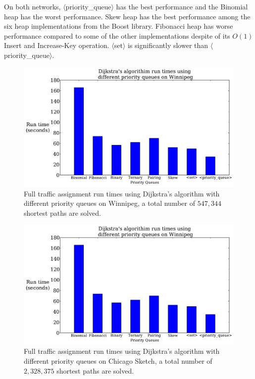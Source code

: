 On both networks, 
$\langle$priority\_queue$\rangle$ has the best performance and the Binomial heap has the worst performance.
Skew heap has the best performance among the six heap implementations from the Boost library.
Fibonacci heap has worse performance compared to some of the other implementations despite of its $O(1)$ Insert and Increase-Key operation.
$\langle$set$\rangle$ is significantly slower than $\langle$priority\_queue$\rangle$.


\begin{figure}[!ht]
    \centering
    \includegraphics[page=1, width=\textwidth, height=.4\textheight]{img/pq_runtime}
    \caption{Full traffic assignment run times using Dijkstra's algorithm with different priority queues on Winnipeg, a total number of $547{,}344$ shortest paths are solved.}
    \label{fig:pq_runtime2}
\end{figure}
\begin{figure}[!ht]
    \centering
    \includegraphics[page=2, width=\textwidth, height=.4\textheight]{img/pq_runtime}
    \caption{Full traffic assignment run times using Dijkstra's algorithm with different priority queues on Chicago Sketch, a total number of $2{,}328{,}375$ shortest paths are solved.}
    \label{fig:pq_runtime}
\end{figure}

